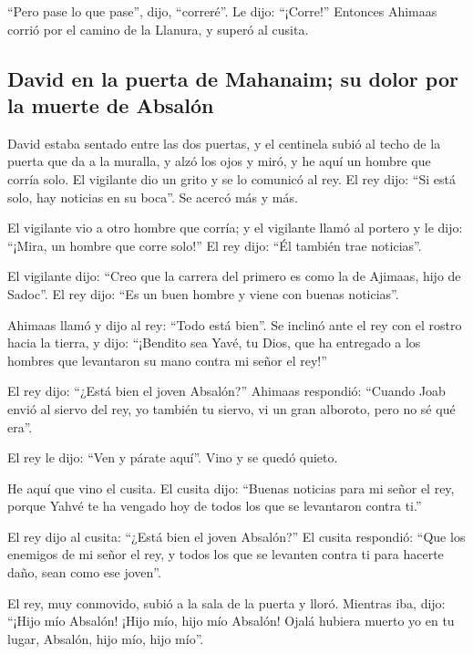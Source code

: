 \begin{paracol}{2}
 ``Pero pase lo que pase'', dijo, ``correré''. Le dijo:
``¡Corre!'' Entonces Ahimaas corrió por el camino de la Llanura, y
superó al cusita.

\hypertarget{david-en-la-puerta-de-mahanaim-su-dolor-por-la-muerte-de-absaluxf3n}{%
\subsection{David en la puerta de Mahanaim; su dolor por la muerte de
Absalón}\label{david-en-la-puerta-de-mahanaim-su-dolor-por-la-muerte-de-absaluxf3n}}

 David estaba sentado entre las dos puertas, y el
centinela subió al techo de la puerta que da a la muralla, y alzó los
ojos y miró, y he aquí un hombre que corría solo.  El
vigilante dio un grito y se lo comunicó al rey. El rey dijo: ``Si está
solo, hay noticias en su boca''. Se acercó más y más.

 El vigilante vio a otro hombre que corría; y el
vigilante llamó al portero y le dijo: ``¡Mira, un hombre que corre
solo!'' El rey dijo: ``Él también trae noticias''.

 El vigilante dijo: ``Creo que la carrera del primero es
como la de Ajimaas, hijo de Sadoc''. El rey dijo: ``Es un buen hombre y
viene con buenas noticias''.

 Ahimaas llamó y dijo al rey: ``Todo está bien''. Se
inclinó ante el rey con el rostro hacia la tierra, y dijo: ``¡Bendito
sea Yavé, tu Dios, que ha entregado a los hombres que levantaron su mano
contra mi señor el rey!''

 El rey dijo: ``¿Está bien el joven Absalón?'' Ahimaas
respondió: ``Cuando Joab envió al siervo del rey, yo también tu siervo,
vi un gran alboroto, pero no sé qué era''.

 El rey le dijo: ``Ven y párate aquí''. Vino y se quedó
quieto.

 He aquí que vino el cusita. El cusita dijo: ``Buenas
noticias para mi señor el rey, porque Yahvé te ha vengado hoy de todos
los que se levantaron contra ti.''

 El rey dijo al cusita: ``¿Está bien el joven Absalón?''
El cusita respondió: ``Que los enemigos de mi señor el rey, y todos los
que se levanten contra ti para hacerte daño, sean como ese joven''.

 El rey, muy conmovido, subió a la sala de la puerta y
lloró. Mientras iba, dijo: ``¡Hijo mío Absalón! ¡Hijo mío, hijo mío
Absalón! Ojalá hubiera muerto yo en tu lugar, Absalón, hijo mío, hijo
mío''.


\end{paracol}
